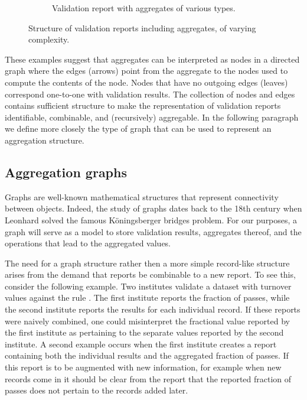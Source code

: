 \begin{figure}[!t]
\begin{subfigure}[b]{0.7\textwidth}
    \caption{Validation report with aggregates of various types.}
    \label{fig:graph3}
  \end{subfigure}
  \caption{Structure of validation reports including aggregates, of varying complexity.}
  \label{fig:graphs}
\end{figure}

These examples suggest that aggregates can be interpreted as nodes in a
directed graph where the edges (arrows) point from the aggregate to the nodes
used to compute the contents of the node. Nodes that have no outgoing edges
(leaves) correspond one-to-one with validation results.  The collection of
nodes and edges contains sufficient structure to make the representation of
validation reports identifiable, combinable, and (recursively) aggregable. In
the following paragraph we define more closely the type of graph that can be
used to represent an aggregation structure.


\subsection{Aggregation graphs}
\label{sect:aggregationgraphs}
Graphs are well-known mathematical structures that represent connectivity
between objects. Indeed, the  study of graphs dates back to the 18th century
when Leonhard \citet{euler1741solutio} solved the famous K\"oningsberger
bridges problem.  For our purposes, a graph will serve as a model to store
validation results, aggregates thereof, and the operations that lead to the
aggregated values.

The need for a graph structure rather then a more simple record-like structure
arises from the demand that reports be combinable to a new report.  To see
this, consider the following example. Two institutes validate a dataset with
turnover values against the rule . The first institute
reports the fraction of passes, while the second institute reports the results
for each individual record. If these reports were naively combined, one could
misinterpret the fractional value reported by the first institute as pertaining
to the separate values reported by the second institute. A second example
occurs when the first institute creates a report containing both the individual
results and the aggregated fraction of passes. If this report is to be
augmented with new information, for example when new records come in it should
be clear from the report that the reported fraction of passes does not pertain
to the records added later.


